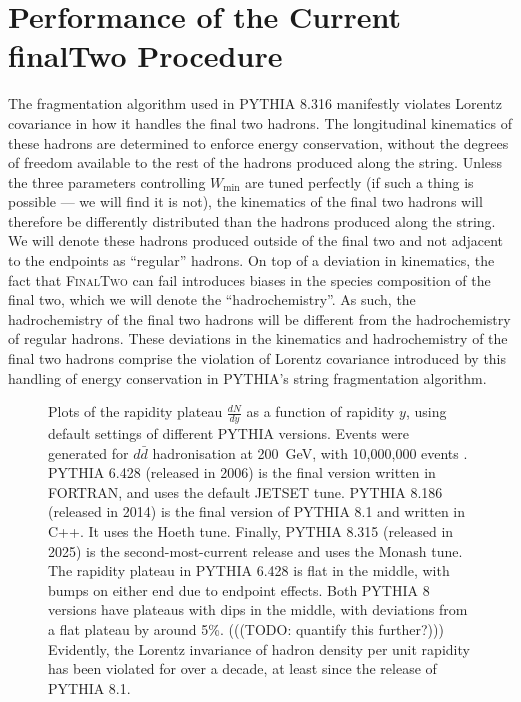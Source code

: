 \documentclass[12pt,a4paper]{report}
\begin{document}
\section{Performance of the Current finalTwo Procedure}
The fragmentation algorithm used in PYTHIA 8.316 manifestly violates Lorentz covariance in how it handles the final two hadrons. The longitudinal kinematics of these hadrons are determined to enforce energy conservation, without the degrees of freedom available to the rest of the hadrons produced along the string. Unless the three parameters controlling $W_\text{min}$ are tuned perfectly (if such a thing is possible --- we will find it is not), the kinematics of the final two hadrons will therefore be differently distributed than the hadrons produced along the string. We will denote these hadrons produced outside of the final two and not adjacent to the endpoints as ``regular'' hadrons. On top of a deviation in kinematics, the fact that \textsc{FinalTwo} can fail introduces biases in the species composition of the final two, which we will denote the ``hadrochemistry''. As such, the hadrochemistry of the final two hadrons will be different from the hadrochemistry of regular hadrons. These deviations in the kinematics and hadrochemistry of the final two hadrons comprise the violation of Lorentz covariance introduced by this handling of energy conservation in PYTHIA's string fragmentation algorithm.

\begin{figure}
  \centering
  
  \caption{Plots of the rapidity plateau $\frac{dN}{dy}$ as a function of rapidity $y$, using default settings of different PYTHIA versions. Events were generated for $d\bar{d}$ hadronisation at \qty{200}{\giga\electronvolt}, with 10,000,000 events \protect\footnotemark. PYTHIA 6.428 (released in 2006) is the final version written in FORTRAN, and uses the default JETSET tune. PYTHIA 8.186 (released in 2014) is the final version of PYTHIA 8.1 and written in C++. It uses the Hoeth tune. Finally, PYTHIA 8.315 (released in 2025) is the second-most-current release and uses the Monash tune. The rapidity plateau in PYTHIA 6.428 is flat in the middle, with bumps on either end due to endpoint effects. Both PYTHIA 8 versions have plateaus with dips in the middle, with deviations from a flat plateau by around 5\%. (((TODO: quantify this further?))) Evidently, the Lorentz invariance of hadron density per unit rapidity has been violated for over a decade, at least since the release of PYTHIA 8.1.}
  \label{fig:version-plots}
\end{figure}
\end{document}
